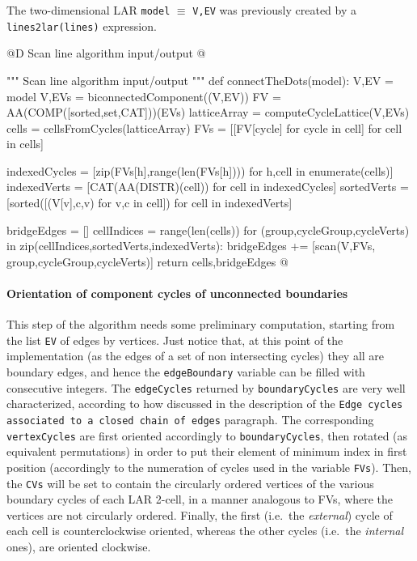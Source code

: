 \documentclass[11pt,oneside]{article}	%
\begin{document}
The two-dimensional LAR \texttt{model} $\equiv$ \texttt{V,EV} was previously created by a \texttt{lines2lar(lines)} expression.

@D Scan line algorithm input/output
@{""" Scan line algorithm input/output """
def connectTheDots(model):
    V,EV = model
    V,EVs = biconnectedComponent((V,EV))
    FV = AA(COMP([sorted,set,CAT]))(EVs)
    latticeArray = computeCycleLattice(V,EVs)
    cells = cellsFromCycles(latticeArray)
    FVs = [[FV[cycle] for cycle in cell] for cell in cells]
    
    indexedCycles = [zip(FVs[h],range(len(FVs[h])))   for h,cell in enumerate(cells)]
    indexedVerts = [CAT(AA(DISTR)(cell)) for cell in indexedCycles]
    sortedVerts = [sorted([(V[v],c,v) for v,c in cell]) for cell in indexedVerts]
    
    bridgeEdges = []
    cellIndices = range(len(cells))
    for (group,cycleGroup,cycleVerts) in zip(cellIndices,sortedVerts,indexedVerts):
        bridgeEdges += [scan(V,FVs, group,cycleGroup,cycleVerts)]
    return cells,bridgeEdges
@}

\paragraph{Orientation of component cycles of unconnected boundaries}

This step of the algorithm needs some preliminary computation, starting from the list \texttt{EV} of edges by vertices. Just notice that, at this point of the implementation (as the edges of a set of non intersecting cycles) they all are boundary edges, and hence the \texttt{edgeBoundary} variable can be filled with consecutive integers. The \texttt{edgeCycles} returned by \texttt{boundaryCycles} are very well characterized, according to how discussed in the description of the \texttt{Edge cycles associated to a closed chain of edges} paragraph.
The corresponding \texttt{vertexCycles} are first oriented accordingly to \texttt{boundaryCycles}, then rotated (as equivalent permutations) in order to put their element of minimum index in first position (accordingly to the numeration of cycles used in the variable \texttt{FVs}). Then, the \texttt{CVs} will be set to contain the circularly ordered vertices of the various boundary cycles of each LAR 2-cell, in a manner analogous to FVs, where the vertices are not circularly ordered. Finally, the first (i.e.~the \emph{external}) cycle of each cell is counterclockwise oriented, whereas the other cycles (i.e.~the \emph{internal} ones), are oriented clockwise.
\end{document}
